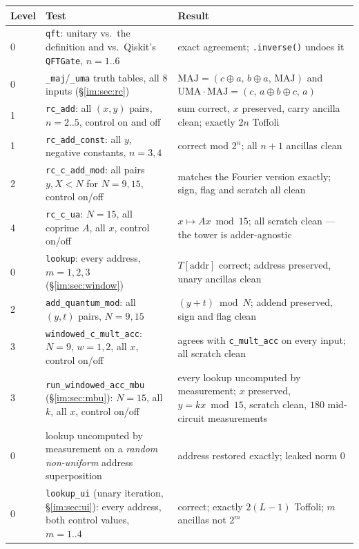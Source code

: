 \documentclass[11pt]{article}
\newcommand{\code}[1]{\texttt{#1}}
\theoremstyle{plain}
\theoremstyle{remark}
\begin{document}
\begin{center}\small
\begin{tabular}{@{}lp{}p{}@{}}
\toprule
Level & Test & Result\\
\midrule
0 & \code{qft}: unitary vs.\ the definition and vs.\ Qiskit's \code{QFTGate}, $n=1..6$
  & exact agreement; \code{.inverse()} undoes it\\[2pt]
0 & \code{\_maj}/\code{\_uma} truth tables, all $8$ inputs (\S\ref{im:sec:rc})
  & $\mathrm{MAJ}=(c{\oplus}a,\,b{\oplus}a,\,\mathrm{MAJ})$ and
    $\mathrm{UMA}\!\cdot\!\mathrm{MAJ}=(c,\,a{\oplus}b{\oplus}c,\,a)$\\[2pt]
1 & \code{rc\_add}: all $(x,y)$ pairs, $n=2..5$, control on and off
  & sum correct, $x$ preserved, carry ancilla clean; exactly $2n$ Toffoli\\[2pt]
1 & \code{rc\_add\_const}: all $y$, negative constants, $n=3,4$
  & correct mod $2^n$; all $n{+}1$ ancillas clean\\[2pt]
2 & \code{rc\_c\_add\_mod}: all pairs $y,X<N$ for $N=9,15$, control on/off
  & matches the Fourier version exactly; sign, flag and scratch all clean\\[2pt]
4 & \code{rc\_c\_ua}: $N=15$, all coprime $A$, all $x$, control on/off
  & $x\mapsto Ax\bmod15$; all scratch clean --- the tower is adder-agnostic\\[2pt]
0 & \code{lookup}: every address, $m=1,2,3$ (\S\ref{im:sec:window})
  & $T[\text{addr}]$ correct; address preserved, unary ancillas clean\\[2pt]
2 & \code{add\_quantum\_mod}: all $(y,t)$ pairs, $N=9,15$
  & $(y{+}t)\bmod N$; addend preserved, sign and flag clean\\[2pt]
3 & \code{windowed\_c\_mult\_acc}: $N=9$, $w=1,2$, all $x$, control on/off
  & agrees with \code{c\_mult\_acc} on every input; all scratch clean\\[2pt]
3 & \code{run\_windowed\_acc\_mbu} (\S\ref{im:sec:mbu}): $N=15$, all $k$, all $x$, control on/off
  & every lookup uncomputed by measurement; $x$ preserved, $y=kx\bmod15$, scratch clean, $180$ mid-circuit measurements\\[2pt]
0 & lookup uncomputed by measurement on a \emph{random non-uniform} address superposition
  & address restored exactly; leaked norm $0$\\[2pt]
0 & \code{lookup\_ui} (unary iteration, \S\ref{im:sec:ui}): every address, both control values, $m=1..4$
  & correct; exactly $2(L{-}1)$ Toffoli; $m$ ancillas not $2^m$\\[2pt]

\end{tabular}
\end{center}
\end{document}
